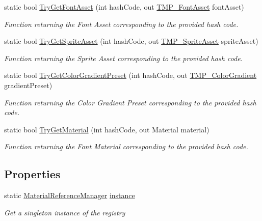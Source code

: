 \begin{DoxyCompactItemize}
static bool \mbox{\hyperlink{class_t_m_pro_1_1_material_reference_manager_aea90526985cf5081a931bfbc4d36af81}{Try\+Get\+Font\+Asset}} (int hash\+Code, out \mbox{\hyperlink{class_t_m_pro_1_1_t_m_p___font_asset}{T\+M\+P\+\_\+\+Font\+Asset}} font\+Asset)
\begin{DoxyCompactList}\small\item\em Function returning the Font Asset corresponding to the provided hash code. \end{DoxyCompactList}\item 
static bool \mbox{\hyperlink{class_t_m_pro_1_1_material_reference_manager_a134f55b51c7660176516e2fe3b71d4ae}{Try\+Get\+Sprite\+Asset}} (int hash\+Code, out \mbox{\hyperlink{class_t_m_pro_1_1_t_m_p___sprite_asset}{T\+M\+P\+\_\+\+Sprite\+Asset}} sprite\+Asset)
\begin{DoxyCompactList}\small\item\em Function returning the Sprite Asset corresponding to the provided hash code. \end{DoxyCompactList}\item 
static bool \mbox{\hyperlink{class_t_m_pro_1_1_material_reference_manager_a61de4a348042d6714254fd9558f8f632}{Try\+Get\+Color\+Gradient\+Preset}} (int hash\+Code, out \mbox{\hyperlink{class_t_m_pro_1_1_t_m_p___color_gradient}{T\+M\+P\+\_\+\+Color\+Gradient}} gradient\+Preset)
\begin{DoxyCompactList}\small\item\em Function returning the Color Gradient Preset corresponding to the provided hash code. \end{DoxyCompactList}\item 
static bool \mbox{\hyperlink{class_t_m_pro_1_1_material_reference_manager_a4826b2b5ac5de579423e0eaee6955dfc}{Try\+Get\+Material}} (int hash\+Code, out Material material)
\begin{DoxyCompactList}\small\item\em Function returning the Font Material corresponding to the provided hash code. \end{DoxyCompactList}\end{DoxyCompactItemize}
\subsection*{Properties}
\begin{DoxyCompactItemize}
\item 
static \mbox{\hyperlink{class_t_m_pro_1_1_material_reference_manager}{Material\+Reference\+Manager}} \mbox{\hyperlink{class_t_m_pro_1_1_material_reference_manager_a51b1daac64638054a8ae2afbae3628f5}{instance}}
\begin{DoxyCompactList}\small\item\em Get a singleton instance of the registry \end{DoxyCompactList}\end{DoxyCompactItemize}



